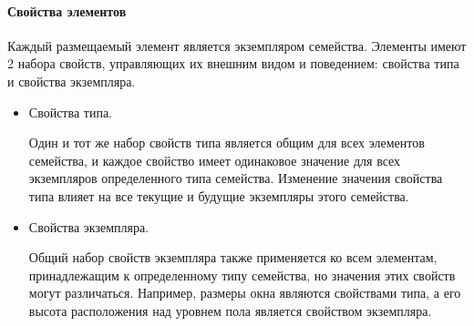 ﻿\paragraph{Свойства элементов}

Каждый размещаемый элемент является экземпляром семейства.
Элементы имеют 2 набора свойств, управляющих их внешним видом и поведением:
свойства типа и свойства экземпляра.%
\cite{DocRevit}

\begin{itemize}
    \item {
        Свойства типа.

        Один и тот же набор свойств типа является общим для всех элементов семейства,
        и каждое свойство имеет одинаковое значение для всех экземпляров определенного типа семейства.
        Изменение значения свойства типа влияет на все текущие и будущие экземпляры этого семейства.
    }
    \item {
        Свойства экземпляра.

        Общий набор свойств экземпляра также применяется ко всем элементам,
        принадлежащим к определенному типу семейства,
        но значения этих свойств могут различаться.
        Например, размеры окна являются свойствами типа,
        а его высота расположения над уровнем пола является свойством экземпляра.
    }
\end{itemize}
